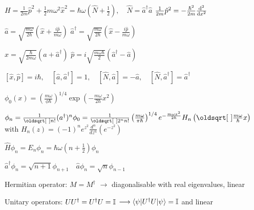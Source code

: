 \begin{squishlist}
    \item$H = \frac{1}{2m}\hat{p}^2 + \frac{1}{2}m \omega^2 \hat{x}^2 = \hbar \omega (\hat{N} + \frac{1}{2}), \quad \hat{N} = \hat{a}^{\dagger} \hat{a}$
    \squishsep $\frac{1}{2m}\hat{p}^2 = - \frac{\hbar^2}{2m} \frac{\textrm{d}^2 }{\textrm{d} x^2}$
    \item $\hat{a} = \sqrt{\frac{m\omega}{2\hbar}} \left( \hat{x} + \frac{i \hat{p}}{m \omega}\right)$ \quad 
     $\hat{a}^{\dagger} = \sqrt{\frac{m\omega}{2\hbar}} \left( \hat{x} - \frac{i \hat{p}}{m \omega}\right)$ \quad 
    \item $\hat{x} = \sqrt{\frac{\hbar }{2 m \omega}}(\hat{a} + \hat{a}^{\dagger})$ \quad $\hat{p} = i \sqrt{\frac{m \omega \hbar}{2}} ( \hat{a}^{\dagger} - \hat{a})$
    \item $[\hat{x}, \hat{p}] = i \hbar, \quad [\hat{a}, \hat{a}^{\dagger}] = 1, \quad [\hat{N}, \hat{a}] = - \hat{a}, \quad [\hat{N},\hat{a}^\dagger] = \hat{a}^{\dagger}$
    \item $\phi_0(x) = \left( \frac{m \omega}{\phi \hbar}   \right)^{1/4} \exp \left( - \frac{m \omega }{2 \hbar} x^2\right)$
    \item $ \phi_n = \frac{1}{\sqrt{n!}}(a^{\dagger})^n \phi_0 = \frac{1}{\sqrt{2^n n!}} \left(\frac{m\omega}{\pi \hbar}\right)^{1/4} e^{-\frac{m \omega x^2}{2 \hbar}} H_n \left(\sqrt{\frac{m \omega }{\hbar}}x \right) \\ $ with $H_n(z) = (-1)^n e^{z^2} \frac{d^n}{dz^n} (e^{-z^2})$
    \item $\hat{H} \phi_n = E_n \phi_n = \hbar \omega (n + \frac{1}{2})\phi_n$
    \item $\hat{a}^{\dagger} \phi_n = \sqrt{n+1} \phi_{n+1} \quad \hat{a}\phi_n = \sqrt{n} \phi_{n-1}$
\end{squishlist}


\begin{squishlist}
    \item Hermitian operator: $M = M^{\dagger}$ $\longrightarrow$ diagonalisable with real eigenvalues, linear
    \item Unitary operators: $U U^{\dagger} = U^{\dagger}U = \mathbb{I}$ $\longrightarrow \braket{\psi | U^{\dagger}U|\psi} = \mathbb{I} $ and linear
\end{squishlist}

